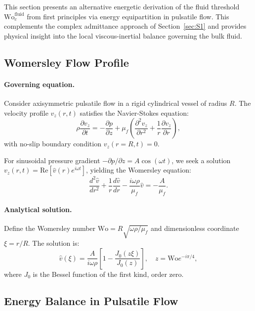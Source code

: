 \documentclass[11pt,a4paper]{article}
\theoremstyle{remark}
\begin{document}
This section presents an alternative energetic derivation of the fluid threshold
$\mathrm{Wo}_c^{\mathrm{fluid}}$ from first principles via energy equipartition
in pulsatile flow. This complements the complex admittance approach of
Section~\ref{sec:S1} and provides physical insight into the local
viscous-inertial balance governing the bulk fluid.

\subsection{Womersley Flow Profile}

\paragraph{Governing equation.}
Consider axisymmetric pulsatile flow in a rigid cylindrical vessel of radius
$R$. The velocity profile $v_z(r, t)$ satisfies the Navier-Stokes equation:
\begin{equation}
    \rho \frac{\partial v_z}{\partial t}
    = -\frac{\partial p}{\partial z}
    + \mu_f \left(\frac{\partial^2 v_z}{\partial r^2} + \frac{1}{r}\frac{\partial v_z}{\partial r}\right),
\end{equation}
with no-slip boundary condition $v_z(r=R, t) = 0$.

For sinusoidal pressure gradient $-\partial p/\partial z = A \cos(\omega t)$, we
seek a solution $v_z(r, t) = \mathrm{Re}[\hat{v}(r) e^{i\omega t}]$, yielding
the Womersley equation:
\begin{equation}
    \frac{d^2\hat{v}}{dr^2} + \frac{1}{r}\frac{d\hat{v}}{dr}
    - \frac{i\omega\rho}{\mu_f} \hat{v} = -\frac{A}{\mu_f}.
\end{equation}

\paragraph{Analytical solution.}
Define the Womersley number $\mathrm{Wo} = R\sqrt{\omega\rho/\mu_f}$ and
dimensionless coordinate $\xi = r/R$. The solution is:
\begin{equation}
    \hat{v}(\xi) = \frac{A}{i\omega\rho}
    \left[1 - \frac{J_0\left(z\xi\right)}{J_0\left(z\right)}\right],
    \quad z = \mathrm{Wo} e^{-i\pi/4},
\end{equation}
where $J_0$ is the Bessel function of the first kind, order zero.

\subsection{Energy Balance in Pulsatile Flow}
\end{document}
